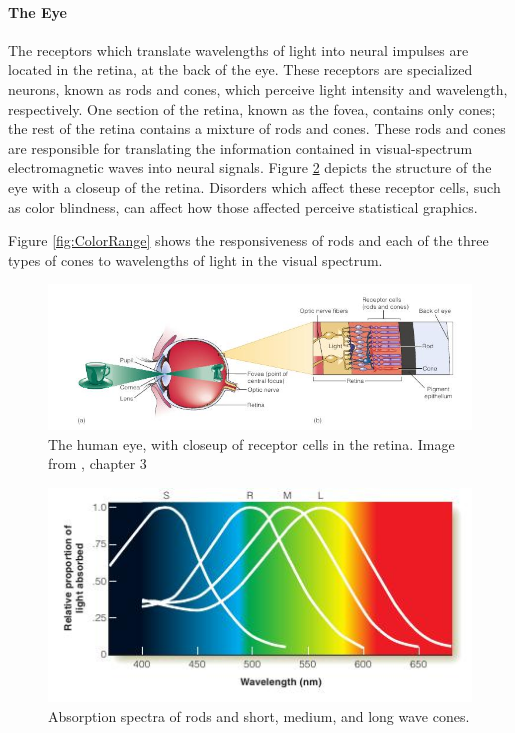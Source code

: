 \documentclass[11pt]{isuthesis}
\begin{document}
\paragraph{The Eye}
The receptors which translate wavelengths of light into neural impulses are located in the retina, at the back of the eye. These receptors are specialized neurons, known as rods and cones, which perceive light intensity and wavelength, respectively. One section of the retina, known as the fovea, contains only cones; the rest of the retina contains a mixture of rods and cones. These rods and cones are responsible for translating the information contained in visual-spectrum electromagnetic waves into neural signals. Figure \ref{fig:retina} depicts the structure of the eye with a closeup of the retina. Disorders which affect these receptor cells, such as color blindness, can affect how those affected perceive statistical graphics. 

Figure \ref{fig:ColorRange} shows the responsiveness of rods and each of the three types of cones to wavelengths of light in the visual spectrum. 

\begin{figure}
\centering
\includegraphics[width=.8\textwidth, keepaspectratio=TRUE]{Figure/LitReview/Retina}
\caption[The human eye, with closeup of receptor cells in the retina]{The human eye, with closeup of receptor cells in the retina. Image from \protect\citealt{goldstein}, chapter 3} \label{fig:retina}
\end{figure}

\begin{figure}
\centering
\includegraphics[width=.8\textwidth, keepaspectratio=TRUE]{Figure/LitReview/AbsorptionSpectra}
\caption[Absorption spectra of retinal cells]{Absorption spectra of rods and short, medium, and long wave cones.} \label{fig:retina}
\end{figure}
\end{document}
